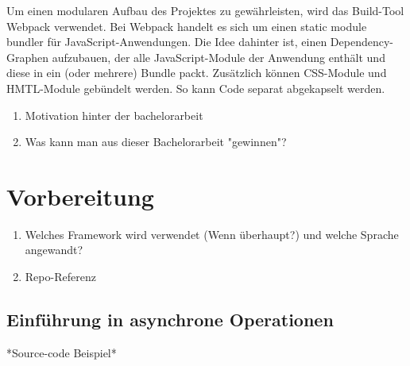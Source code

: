 Um einen modularen Aufbau des Projektes zu gewährleisten, wird das Build-Tool \glqq{}Webpack\grqq{} verwendet. Bei Webpack handelt es sich um einen \glqq{}static module bundler\grqq{} für JavaScript-Anwendungen. Die Idee dahinter ist, einen Dependency-Graphen aufzubauen, der alle JavaScript-Module der Anwendung enthält und diese in ein (oder mehrere) Bundle packt. Zusätzlich können CSS-Module und HMTL-Module gebündelt werden. So kann Code separat abgekapselt werden.\cite{Webpack-basics}

\begin{enumerate} 
\item Motivation hinter der bachelorarbeit
\item Was kann man aus dieser Bachelorarbeit "gewinnen"?
\end{enumerate}

\section{Vorbereitung}
\begin{enumerate} 
\item Welches Framework wird verwendet (Wenn überhaupt?) und welche Sprache angewandt?
\item Repo-Referenz
\end{enumerate}

\subsection{Einführung in asynchrone Operationen}
*Source-code Beispiel*
